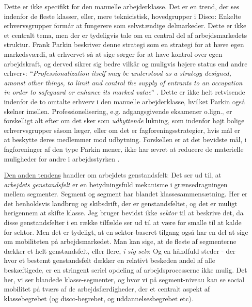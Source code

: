 Dette er ikke specifikt for den manuelle arbejderklasse. Det er en trend, der ses indenfor de fleste klasser, eller, mere teknicistisk, hovedgrupper i Disco: Enkelte erhvervsgrupper formår at fungerere som selvstændige delmarkeder. Dette er ikke et centralt tema, men der er tydeligvis tale om en central del af arbejdsmarkedets struktur. Frank Parkin beskriver denne strategi som en strategi for at hæve egen markedsværdi, at erhvervet så at sige sørger for at have kontrol over egen arbejdskraft, og derved sikrer sig bedre vilkår og muligvis højere status end andre erhverv: “\emph{Professionalization itself may be understood as a strategy designed, amonst other things, to limit and control the supply of entrants to an occupation in order to safeguard or enhance its marked value}” \parencite[54]{Parkin1979}. Dette er ikke helt retvisende indenfor de to omtalte erhverv i den manuelle arbejderklasse, hvilket Parkin også skelner imellen. Professionelisering, e.g. adgangsgivende eksamener o.lign., er forskelligt alt efter om det sker som \emph{udbyttende} lukning, som indenfor højt bolige erhvervsgrupper såsom læger, eller om det er fagforeningsstrategier, hvis mål er at beskytte deres medlemmer mod udbytning. Forskellen er at det bevidste mål, i fagforeninger af den type Parkin mener, ikke har ævret at reducere de materielle muligheder for andre i arbejdsstyrken \parencite[57]{Parkin1979}. 

\underline{Den anden tendens} handler om arbejdets genstandsfelt: Det ser ud til, at \emph{arbejdets genstandsfelt} er en betydningsfuld mekanisme i grænsedragningen mellem segmenter. Segment  og segment  har blandet klassesammensætning. Her er det henholdsvis landbrug og skibsdrift, der er genstandsfeltet, og det er muligt herigennem at skifte klasse. Jeg bruger bevidst ikke \emph{sektor} til at beskrive det, da disse genstandsfelter i en række tilfælde ser ud til at være for smalle til at kalde for sektor. Men det er tydeligt, at en sektor-baseret tilgang også har en del at sige om mobiliteten på arbejdsmarkedet. Man kan sige, at de fleste af segmenterne dækker et helt genstandsfelt, eller flere, \emph{i sig selv}: Og en håndfuld steder - der hvor et bestemt genstandsfelt dækker en relativt beskeden andel af alle beskæftigede, er en stringent seriel opdeling af arbejdsprocesserne ikke mulig. Det her, vi ser blandede klasse-segmenter, og hvor vi på segment-niveau kan se social mobilitet på tværs af de arbejdsfærdigheder, der et centralt aspekt af klassebegrebet (og disco-begrebet, og uddannelsesbegrebet etc). 

